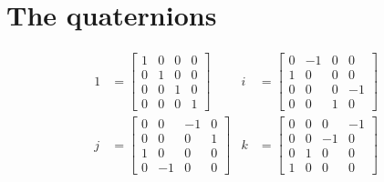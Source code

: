 \documentclass{ximera}
\begin{document}
\section{The quaternions}


\begin{align*}
  1 &=
  \begin{bmatrix}
    1 & 0 & 0 & 0 \\
    0 & 1 & 0 & 0 \\
    0 & 0 & 1 & 0 \\
    0 & 0 & 0 & 1
  \end{bmatrix}
  &
i &=
\begin{bmatrix}
  0 & -1 & 0 &  0 \\
  1 &  0 & 0 &  0 \\
  0 &  0 & 0 & -1 \\
  0 &  0 & 1 &  0
\end{bmatrix} \\
j &=
\begin{bmatrix}
  0 &  0 & -1 &  0 \\
  0 &  0 &  0 &  1 \\
  1 &  0 &  0 &  0 \\
  0 & -1 &  0 &  0 
\end{bmatrix}
&
k &=
\begin{bmatrix}
  0 &  0 &  0 & -1 \\
  0 &  0 & -1 &  0 \\
  0 &  1 &  0 &  0 \\
  1 &  0 &  0 &  0 
\end{bmatrix}
\end{align*}
\end{document}

